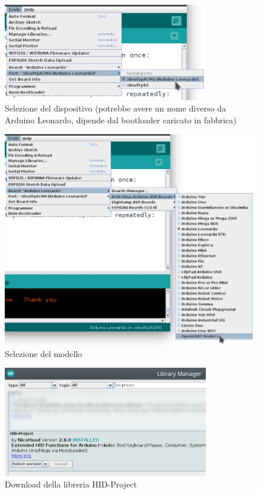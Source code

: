 \begin{figure}[H]
	\centering
	\includegraphics[width=0.8\textwidth]{Dispositivo_files/flashing_03.png}
	\caption{Selezione del dispositivo (potrebbe avere un nome diverso da Arduino Leonardo, dipende dal bootloader caricato in fabbrica)}
	\label{fig:flashing_03}
\end{figure}

\begin{figure}[H]
	\centering
	\includegraphics[width=\textwidth]{Dispositivo_files/flashing_04.png}
	\caption{Selezione del modello}
	\label{fig:flashing_04}
\end{figure}

\begin{figure}[H]
	\centering
	\includegraphics[width=0.8\textwidth]{Dispositivo_files/flashing_06.png}
	\caption{Download della libreria HID-Project}
	\label{fig:flashing_06}
\end{figure}

